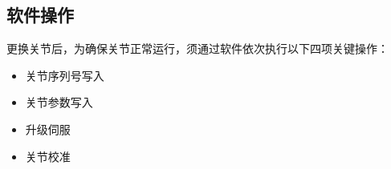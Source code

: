 \documentclass[a4paper,11pt,english,openany,oneside]{sphinxmanual}
\begin{document}
\subsection{软件操作}
\label{\detokenize{_u66f4_u6362_u5173_u8282:id19}}\label{\detokenize{_u66f4_u6362_u5173_u8282:id20}}
\sphinxAtStartPar
更换关节后，为确保关节正常运行，须通过软件依次执行以下四项关键操作：
\begin{itemize}
\item {} 
\sphinxAtStartPar
关节序列号写入

\item {} 
\sphinxAtStartPar
关节参数写入

\item {} 
\sphinxAtStartPar
升级伺服

\item {} 
\sphinxAtStartPar
关节校准

\end{itemize}
\end{document}
